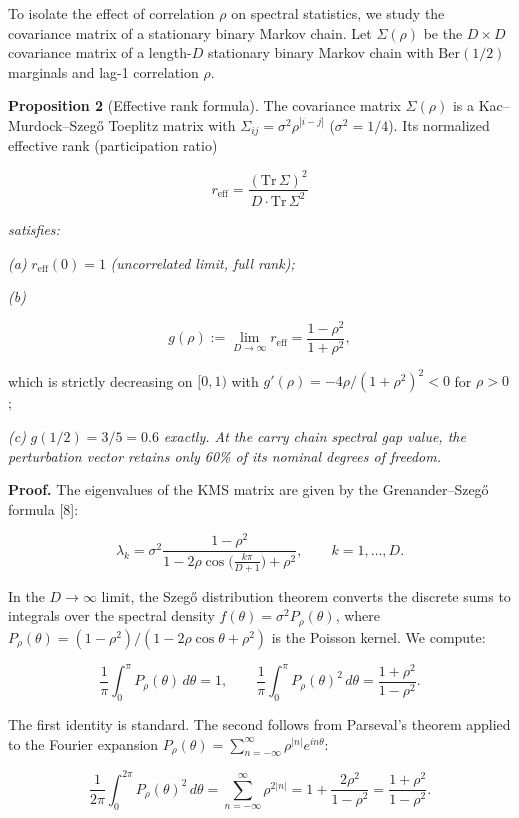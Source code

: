 \documentclass[
  11pt,
]{article}
\begin{document}
To isolate the effect of correlation \(\rho\) on spectral statistics, we study
the covariance matrix of a stationary binary Markov chain. Let \(\Sigma(\rho)\)
be the \(D \times D\) covariance matrix of a length-\(D\) stationary binary
Markov chain with \(\mathrm{Ber}(1/2)\) marginals and lag-1 correlation
\(\rho\).

\textbf{Proposition 2} (Effective rank formula). The covariance matrix
\(\Sigma(\rho)\) is a Kac--Murdock--Szegő Toeplitz matrix with
\(\Sigma_{ij} = \sigma^2 \rho^{|i-j|}\) (\(\sigma^2 = 1/4\)). Its normalized
effective rank (participation ratio)

\[r_{\mathrm{eff}} = \frac{(\mathrm{Tr}\,\Sigma)^2}{D \cdot \mathrm{Tr}\,\Sigma^2}\]

\emph{satisfies:}

\emph{(a)} \(r_{\mathrm{eff}}(0) = 1\) \emph{(uncorrelated limit, full rank);}

\emph{(b)}

\[g(\rho) := \lim_{D \to \infty} r_{\mathrm{eff}} = \frac{1 - \rho^2}{1 + \rho^2},\]

which is strictly decreasing on \([0, 1)\) with
\(g'(\rho) = -4\rho/(1+\rho^2)^2 < 0\) for \(\rho > 0\);

\emph{(c)} \(g(1/2) = 3/5 = 0.6\) \emph{exactly. At the carry chain spectral gap
value, the perturbation vector retains only 60\% of its nominal degrees of
freedom.}

\textbf{Proof.} The eigenvalues of the KMS matrix are given by the
Grenander--Szegő formula {[}8{]}:

\[\lambda_k = \sigma^2 \frac{1-\rho^2}{1 - 2\rho\cos\!\bigl(\frac{k\pi}{D+1}\bigr) + \rho^2}, \qquad k = 1, \ldots, D.\]

In the \(D \to \infty\) limit, the Szegő distribution theorem converts the
discrete sums to integrals over the spectral density
\(f(\theta) = \sigma^2 P_\rho(\theta)\), where
\(P_\rho(\theta) = (1-\rho^2)/(1-2\rho\cos\theta+\rho^2)\) is the Poisson
kernel. We compute:

\[\frac{1}{\pi}\int_0^\pi P_\rho(\theta)\,d\theta = 1, \qquad \frac{1}{\pi}\int_0^\pi P_\rho(\theta)^2\,d\theta = \frac{1+\rho^2}{1-\rho^2}.\]

The first identity is standard. The second follows from Parseval's theorem
applied to the Fourier expansion
\(P_\rho(\theta) = \sum_{n=-\infty}^{\infty} \rho^{|n|} e^{in\theta}\):

\[\frac{1}{2\pi}\int_0^{2\pi} P_\rho(\theta)^2\,d\theta = \sum_{n=-\infty}^{\infty} \rho^{2|n|} = 1 + \frac{2\rho^2}{1-\rho^2} = \frac{1+\rho^2}{1-\rho^2}.\]
\end{document}
